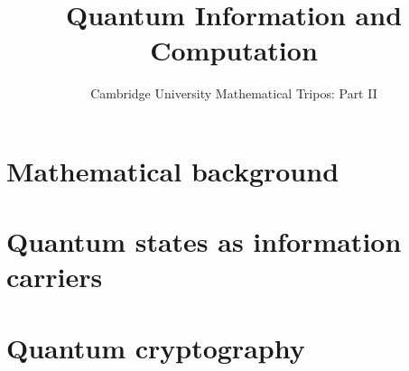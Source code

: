 \documentclass{article}
\title{Quantum Information and Computation}
\author{Cambridge University Mathematical Tripos: Part II}
\begin{document}
\maketitle

\tableofcontentsnewpage{}

\section{Mathematical background}

\section{Quantum states as information carriers}

\section{Quantum cryptography}

\end{document}
